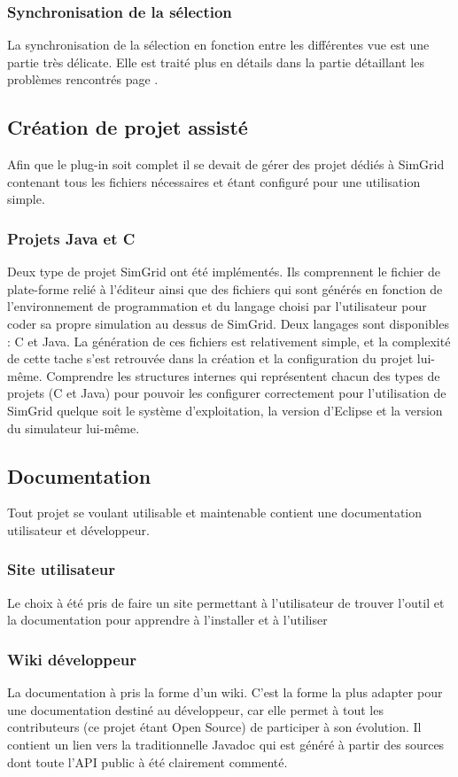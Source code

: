\documentclass{article}
\begin{document}
    \subsubsection{Synchronisation de la sélection}
        La synchronisation de la sélection en fonction entre les différentes vue est une partie très délicate. Elle est traité plus en détails dans la partie détaillant les problèmes rencontrés page \pageref{selection}.
    \subsection{Création de projet assisté}
    Afin que le plug-in soit complet il se devait de gérer des projet dédiés à SimGrid contenant tous les fichiers nécessaires et étant configuré pour une utilisation simple.
        \subsubsection{Projets Java et C }
        Deux type de projet SimGrid ont été implémentés. Ils comprennent le fichier de plate-forme relié à l'éditeur ainsi que des fichiers qui sont générés en fonction de l'environnement de programmation et du langage choisi par l'utilisateur pour coder sa propre simulation au dessus de SimGrid. Deux langages sont disponibles : C et Java. La génération de ces fichiers est relativement simple, et la complexité de cette tache s'est retrouvée dans la création et la configuration du projet lui-même. Comprendre les structures internes qui représentent chacun des types de projets (C et Java) pour pouvoir les configurer correctement pour l'utilisation de SimGrid quelque soit le système d'exploitation, la version d'Eclipse et la version du simulateur lui-même.
    \subsection{Documentation}
    Tout projet se voulant utilisable et maintenable contient une documentation utilisateur et développeur.
        \subsubsection{Site utilisateur}
        Le choix à été pris de faire un site permettant à l'utilisateur de trouver l'outil et la documentation pour apprendre à l'installer et à l'utiliser 
        \subsubsection{Wiki développeur}
        La documentation à pris la forme d'un wiki. C'est la forme la plus adapter pour une documentation destiné au développeur, car elle permet à tout les contributeurs (ce projet étant Open Source) de participer à son évolution. Il contient un lien vers la traditionnelle Javadoc qui est généré à partir des sources dont toute l'API public à été clairement commenté.
\end{document}
